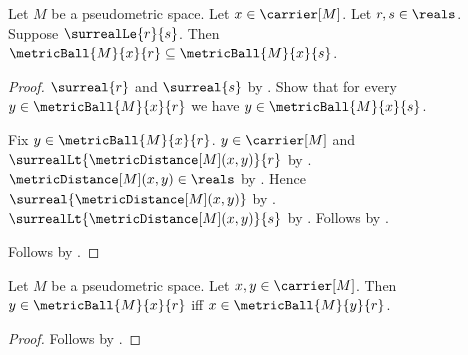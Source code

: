 \begin{proposition}\label{metric_ball_monotone}
    Let $M$ be a pseudometric space.
    Let $x\in\carrier[M]$.
    Let $r,s\in\reals$.
    Suppose $\surrealLe{r}{s}$.
    Then $\metricBall{M}{x}{r}\subseteq\metricBall{M}{x}{s}$.
\end{proposition}
\begin{proof}
    $\surreal{r}$ and $\surreal{s}$
        by .
    Show that for every $y\in\metricBall{M}{x}{r}$ we have
        $y\in\metricBall{M}{x}{s}$.
    \begin{subproof}
        Fix $y\in\metricBall{M}{x}{r}$.
        $y\in\carrier[M]$ and
            $\surrealLt{\metricDistance[M](x,y)}{r}$
            by .
        $\metricDistance[M](x,y)\in\reals$
            by .
        Hence $\surreal{\metricDistance[M](x,y)}$
            by .
        $\surrealLt{\metricDistance[M](x,y)}{s}$
            by .
        Follows by .
    \end{subproof}
    Follows by .
\end{proof}

\begin{proposition}\label{metric_ball_symmetric_membership}
    Let $M$ be a pseudometric space.
    Let $x,y\in\carrier[M]$.
    Then $y\in\metricBall{M}{x}{r}$ iff
        $x\in\metricBall{M}{y}{r}$.
\end{proposition}
\begin{proof}
    Follows by
        .
\end{proof}

